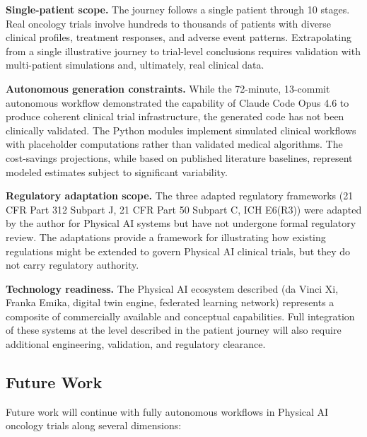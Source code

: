 \documentclass{article}
\begin{document}
\textbf{Single-patient scope.} The journey follows a single patient through 10 stages. Real oncology trials involve hundreds to thousands of patients with diverse clinical profiles, treatment responses, and adverse event patterns. Extrapolating from a single illustrative journey to trial-level conclusions requires validation with multi-patient simulations and, ultimately, real clinical data.

\textbf{Autonomous generation constraints.} While the 72-minute, 13-commit autonomous workflow demonstrated the capability of Claude Code Opus 4.6 to produce coherent clinical trial infrastructure, the generated code has not been clinically validated. The Python modules implement simulated clinical workflows with placeholder computations rather than validated medical algorithms. The cost-savings projections, while based on published literature baselines, represent modeled estimates subject to significant variability.

\textbf{Regulatory adaptation scope.} The three adapted regulatory frameworks (21 CFR Part 312 Subpart J, 21 CFR Part 50 Subpart C, ICH E6(R3)) were adapted by the author for Physical AI systems but have not undergone formal regulatory review. The adaptations provide a framework for illustrating how existing regulations might be extended to govern Physical AI clinical trials, but they do not carry regulatory authority.

\textbf{Technology readiness.} The Physical AI ecosystem described (da Vinci Xi, Franka Emika, digital twin engine, federated learning network) represents a composite of commercially available and conceptual capabilities. Full integration of these systems at the level described in the patient journey will also require additional engineering, validation, and regulatory clearance.

\subsection{Future Work}

Future work will continue with fully autonomous workflows in Physical AI oncology trials along several dimensions:
\end{document}
